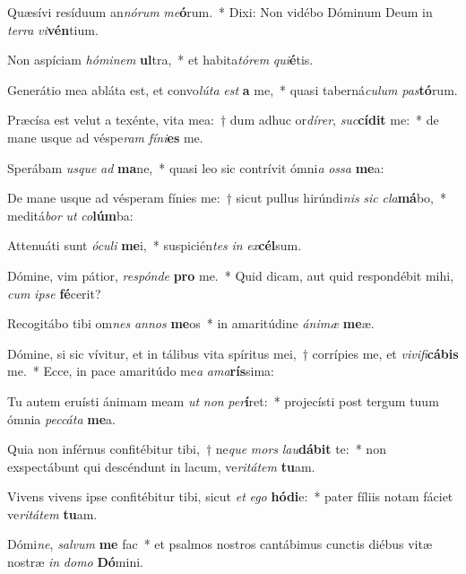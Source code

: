 \item Quæsívi resíduum an\textit{nó}\textit{rum} \textit{me}\textbf{ó}rum.~* Dixi: Non vidébo Dóminum Deum in \textit{ter}\textit{ra} \textit{vi}\textbf{vén}tium.
\item Non aspíciam \textit{hó}\textit{mi}\textit{nem} \textbf{ul}tra,~* et habita\textit{tó}\textit{rem} \textit{qui}\textbf{é}tis.
\item Generátio mea abláta est, et convo\textit{lú}\textit{ta} \textit{est} \textbf{a} me,~* quasi taberná\textit{cu}\textit{lum} \textit{pas}\textbf{tó}rum.
\item Præcísa est velut a texénte, vita mea:~† dum adhuc or\textit{dí}\textit{rer}, \textit{suc}\textbf{cí}\textbf{dit} me:~* de mane usque ad véspe\textit{ram} \textit{fí}\textit{ni}\textbf{es} me.
\item Sperábam \textit{us}\textit{que} \textit{ad} \textbf{ma}ne,~* quasi leo sic contrívit ómni\textit{a} \textit{os}\textit{sa} \textbf{me}a:
\item De mane usque ad vésperam fínies me:~† sicut pullus hirúndi\textit{nis} \textit{sic} \textit{cla}\textbf{má}bo,~* meditá\textit{bor} \textit{ut} \textit{co}\textbf{lúm}ba:
\item Attenuáti sunt \textit{ó}\textit{cu}\textit{li} \textbf{me}i,~* suspicién\textit{tes} \textit{in} \textit{ex}\textbf{cél}sum.
\item Dómine, vim pátior, \textit{re}\textit{spón}\textit{de} \textbf{pro} me.~* Quid dicam, aut quid respondébit mihi, \textit{cum} \textit{ip}\textit{se} \textbf{fé}cerit?
\item Recogitábo tibi om\textit{nes} \textit{an}\textit{nos} \textbf{me}os~* in amaritúdine \textit{á}\textit{ni}\textit{mæ} \textbf{me}æ.
\item Dómine, si sic vívitur, et in tálibus vita spíritus mei,~† corrípies me, et \textit{vi}\textit{vi}\textit{fi}\textbf{cá}\textbf{bis} me.~* Ecce, in pace amaritúdo me\textit{a} \textit{a}\textit{ma}\textbf{rís}sima:
\item Tu autem eruísti ánimam meam \textit{ut} \textit{non} \textit{per}\textbf{í}ret:~* projecísti post tergum tuum ómnia \textit{pec}\textit{cá}\textit{ta} \textbf{me}a.
\item Quia non inférnus confitébitur tibi,~† ne\textit{que} \textit{mors} \textit{lau}\textbf{dá}\textbf{bit} te:~* non exspectábunt qui descéndunt in lacum, ve\textit{ri}\textit{tá}\textit{tem} \textbf{tu}am.
\item Vivens vivens ipse confitébitur tibi, sicut \textit{et} \textit{e}\textit{go} \textbf{hó}\textbf{di}e:~* pater fíliis notam fáciet ve\textit{ri}\textit{tá}\textit{tem} \textbf{tu}am.
\item Dómi\textit{ne}, \textit{sal}\textit{vum} \textbf{me} fac~* et psalmos nostros cantábimus cunctis diébus vitæ nostræ \textit{in} \textit{do}\textit{mo} \textbf{Dó}mini.

